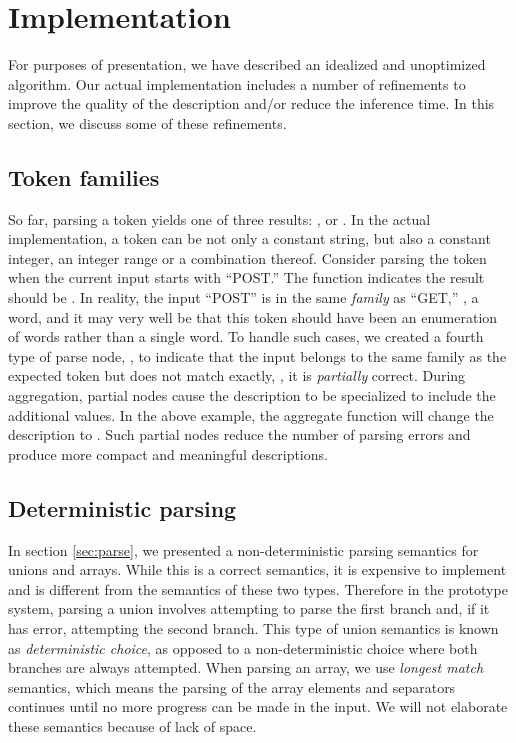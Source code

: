 \section{Implementation}\label{sec:imp}

For purposes of presentation, we have described an idealized and
unoptimized algorithm.  Our actual implementation includes a number of
refinements to improve the quality of the description and/or reduce the
inference time.  In this section, we discuss some of these refinements.

\subsection{Token families}
So far, parsing a  token yields
one of three results: ,  or . 
In the actual implementation, a  token can be not only a constant string, but also
a constant integer, an integer range or a combination thereof.
Consider parsing the token  when
the current input starts with ``POST.'' The
 function indicates the result should be .
In reality, the input ``POST'' is in the same {\em family} as ``GET,'' 
\ie{}, a word,
and it may very well be that this  token should have been 
an enumeration of words rather than a single word.
To handle such cases, we created a fourth type of parse node, , 
to indicate that the input belongs to the same family as the expected
token but does not match exactly, \ie, it is {\em partially} correct.
During aggregation, partial nodes cause the description 
to be specialized to include the additional values.  In the above example, the aggregate 
function will change the description to .
Such partial nodes reduce the number of parsing errors
and produce more compact and meaningful descriptions.

\subsection{Deterministic parsing}
In section \ref{sec:parse}, we presented a non-deterministic parsing semantics
for unions and arrays. While this is a correct semantics, it is expensive
to implement and is different from the \pads{} semantics of these two 
types.
Therefore in the prototype system, parsing a union involves 
attempting to parse the first branch and,
if it has error, attempting the second branch. This type of union semantics
is known as {\em deterministic choice}, as opposed to a non-deterministic
choice where both branches are always attempted.
When parsing an array, we use {\em longest match} semantics,
which means the parsing of the array elements and separators
continues until no more progress can be made in
the input. We will not elaborate these semantics because of lack of space.


